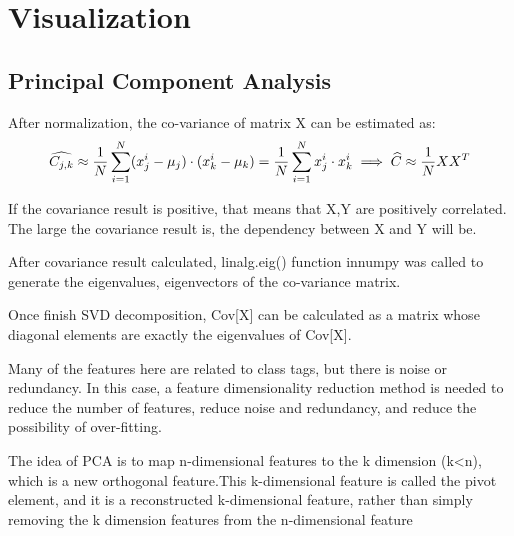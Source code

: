 \documentclass[titlepage,a4paper,12pt,thmsb]{report}
\begin{document}
\newpage

\section{Visualization}

\subsection{Principal Component Analysis}


After normalization, the co-variance of matrix X can be estimated as:
$$
  \widehat{C_{j,k}} \approx \frac{1}{N} \sum_{i=1}^{N} (x_j^i - \mu _j) \cdot (x_k^i - \mu_k) = \frac{1}{N} \sum_{i=1}^{N} x_j^i \cdot x_k^i \\
  \implies \widehat{C} \approx \frac{1}{N}XX^T
$$

If the covariance result is positive, that means that X,Y are positively correlated. The large the covariance result is, the dependency between X and Y will be.

After covariance result calculated, {linalg.eig()} function in{numpy} was called to generate the eigenvalues, eigenvectors of the co-variance matrix.

Once finish SVD decomposition, Cov[X] can be calculated as a matrix whose diagonal elements are exactly the eigenvalues of Cov[X].

Many of the features here are related to class tags, but there is noise or redundancy. In this case, a feature dimensionality reduction method is needed to reduce the number of features, reduce noise and redundancy, and reduce the possibility of over-fitting.

The idea of PCA is to map n-dimensional features to the k dimension (k<n), which is a new orthogonal feature.This k-dimensional feature is called the pivot element, and it is a reconstructed k-dimensional feature, rather than simply removing the k dimension features from the n-dimensional feature

\newpage

\begin{center}
\begin{figure}[h]
{\par}
\end{figure}
{}
\end{center}
\end{document}
